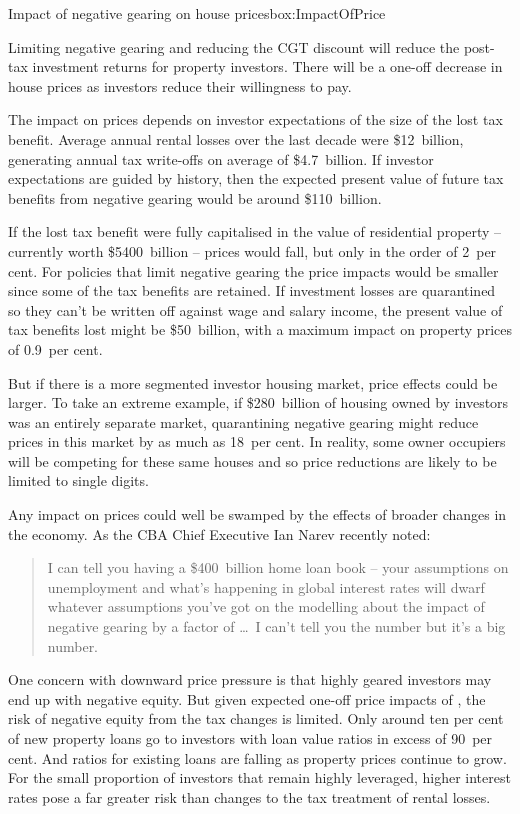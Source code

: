\documentclass{grattan}\usepackage[]{graphicx}\usepackage[]{color}
\begin{document}
\begin{smallbox}{Impact of negative gearing  on house prices}{box:ImpactOfPrice}

Limiting negative gearing and reducing the CGT discount will reduce the post-tax investment returns for property investors. There will be a one-off decrease in house prices as investors reduce their willingness to pay. 

The impact on prices depends on investor expectations of the size of the lost tax benefit. Average annual rental losses over the last decade were \$12~billion, generating annual tax write-offs on average of \$4.7~billion. If investor expectations are guided by history, then the expected present value of future tax benefits from negative gearing would be around \$110~billion.

If the lost tax benefit were fully capitalised in the value of residential property -- currently worth \$5400~billion -- prices would fall, but only in the order of 2~per cent. For policies that limit negative gearing the price impacts would be smaller since some of the tax benefits are retained. If investment losses are quarantined so they can't be written off against wage and salary income, the present value of tax benefits lost might be \$50~billion, with a maximum impact on property prices of 0.9~per cent. 

But if there is a more segmented investor housing market, price effects could be larger. To take an extreme example, if \$280~billion of housing owned by investors was an entirely separate market, quarantining negative gearing might reduce prices in this market by as much as 18~per cent. In reality, some owner occupiers will be competing for these same houses and so price reductions are likely to be limited to single digits. 
\end{smallbox}

Any impact on prices could well be swamped by the effects of broader changes in the economy. As the CBA Chief Executive Ian Narev recently noted:

\begin{quote}
I can tell you having a \$400~billion home loan book -- your assumptions on unemployment and what's happening in global interest rates will dwarf whatever assumptions you've got on the modelling about the impact of negative gearing by a factor of \dots\ I can't tell you the number but it's a big number.
\end{quote}

One concern with downward price pressure is that highly geared investors may end up with negative equity. But given expected one-off price impacts of ,  the risk of negative equity from the tax changes is limited. Only around ten per cent of new property loans go to investors with loan value ratios in excess of 90~per cent.   And ratios for existing loans are falling as property prices continue to grow. For the small proportion of investors that remain highly leveraged, higher interest rates pose a far greater risk than changes to the tax treatment of rental losses.   
\end{document}
